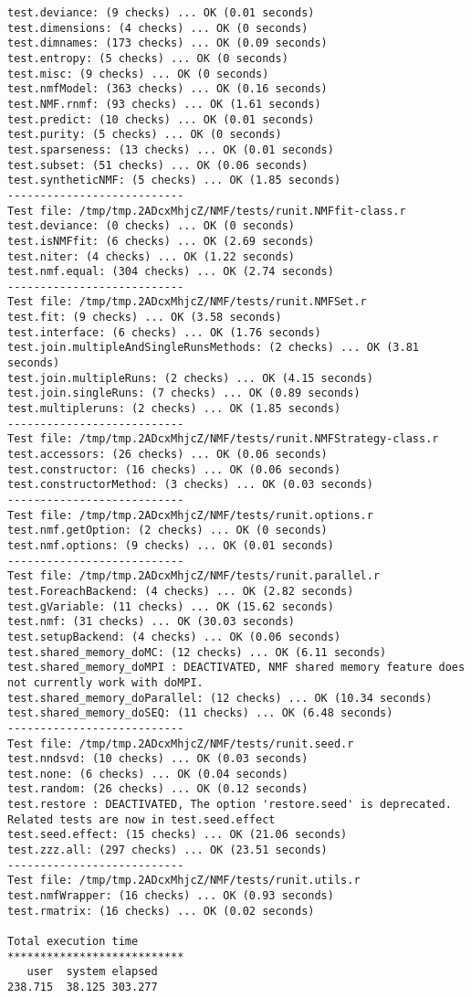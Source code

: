 \documentclass[10pt]{article}
\begin{document}
\begin{verbatim}
test.deviance: (9 checks) ... OK (0.01 seconds)
test.dimensions: (4 checks) ... OK (0 seconds)
test.dimnames: (173 checks) ... OK (0.09 seconds)
test.entropy: (5 checks) ... OK (0 seconds)
test.misc: (9 checks) ... OK (0 seconds)
test.nmfModel: (363 checks) ... OK (0.16 seconds)
test.NMF.rnmf: (93 checks) ... OK (1.61 seconds)
test.predict: (10 checks) ... OK (0.01 seconds)
test.purity: (5 checks) ... OK (0 seconds)
test.sparseness: (13 checks) ... OK (0.01 seconds)
test.subset: (51 checks) ... OK (0.06 seconds)
test.syntheticNMF: (5 checks) ... OK (1.85 seconds)
--------------------------- 
Test file: /tmp/tmp.2ADcxMhjcZ/NMF/tests/runit.NMFfit-class.r 
test.deviance: (0 checks) ... OK (0 seconds)
test.isNMFfit: (6 checks) ... OK (2.69 seconds)
test.niter: (4 checks) ... OK (1.22 seconds)
test.nmf.equal: (304 checks) ... OK (2.74 seconds)
--------------------------- 
Test file: /tmp/tmp.2ADcxMhjcZ/NMF/tests/runit.NMFSet.r 
test.fit: (9 checks) ... OK (3.58 seconds)
test.interface: (6 checks) ... OK (1.76 seconds)
test.join.multipleAndSingleRunsMethods: (2 checks) ... OK (3.81 seconds)
test.join.multipleRuns: (2 checks) ... OK (4.15 seconds)
test.join.singleRuns: (7 checks) ... OK (0.89 seconds)
test.multipleruns: (2 checks) ... OK (1.85 seconds)
--------------------------- 
Test file: /tmp/tmp.2ADcxMhjcZ/NMF/tests/runit.NMFStrategy-class.r 
test.accessors: (26 checks) ... OK (0.06 seconds)
test.constructor: (16 checks) ... OK (0.06 seconds)
test.constructorMethod: (3 checks) ... OK (0.03 seconds)
--------------------------- 
Test file: /tmp/tmp.2ADcxMhjcZ/NMF/tests/runit.options.r 
test.nmf.getOption: (2 checks) ... OK (0 seconds)
test.nmf.options: (9 checks) ... OK (0.01 seconds)
--------------------------- 
Test file: /tmp/tmp.2ADcxMhjcZ/NMF/tests/runit.parallel.r 
test.ForeachBackend: (4 checks) ... OK (2.82 seconds)
test.gVariable: (11 checks) ... OK (15.62 seconds)
test.nmf: (31 checks) ... OK (30.03 seconds)
test.setupBackend: (4 checks) ... OK (0.06 seconds)
test.shared_memory_doMC: (12 checks) ... OK (6.11 seconds)
test.shared_memory_doMPI : DEACTIVATED, NMF shared memory feature does not currently work with doMPI.
test.shared_memory_doParallel: (12 checks) ... OK (10.34 seconds)
test.shared_memory_doSEQ: (11 checks) ... OK (6.48 seconds)
--------------------------- 
Test file: /tmp/tmp.2ADcxMhjcZ/NMF/tests/runit.seed.r 
test.nndsvd: (10 checks) ... OK (0.03 seconds)
test.none: (6 checks) ... OK (0.04 seconds)
test.random: (26 checks) ... OK (0.12 seconds)
test.restore : DEACTIVATED, The option 'restore.seed' is deprecated. Related tests are now in test.seed.effect
test.seed.effect: (15 checks) ... OK (21.06 seconds)
test.zzz.all: (297 checks) ... OK (23.51 seconds)
--------------------------- 
Test file: /tmp/tmp.2ADcxMhjcZ/NMF/tests/runit.utils.r 
test.nmfWrapper: (16 checks) ... OK (0.93 seconds)
test.rmatrix: (16 checks) ... OK (0.02 seconds)

Total execution time
***************************
   user  system elapsed 
238.715  38.125 303.277 

\end{verbatim}
\end{document}
